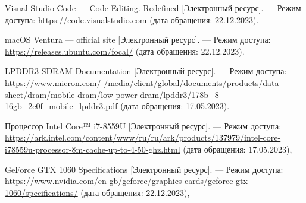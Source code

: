 \begin{thebibliography}{}
	Visual Studio Code --- Code Editing. Redefined [Электронный ресурс]. --- Режим доступа: \url{https://code.visualstudio.com} (дата обращения: 22.12.2023).
	
	macOS Ventura --- official site [Электронный
	ресурс]. --- Режим доступа: \url{https://releases.ubuntu.com/focal/} (дата обращения: 22.12.2023).

	LPDDR3 SDRAM Documentation [Электронный
	ресурс]. --- Режим доступа: \url{https://www.micron.com/-/media/client/global/documents/products/data-sheet/dram/mobile-dram/low-power-dram/lpddr3/178b_8-16gb_2c0f_mobile_lpddr3.pdf} (дата обращения: 17.05.2023).

	Процессор Intel Core™ i7-8559U [Электронный ресурс]. --- Режим доступа: \url{https://ark.intel.com/content/www/ru/ru/ark/products/137979/intel-core-i78559u-processor-8m-cache-up-to-4-50-ghz.html} (дата обращения: 17.05.2023),
	
	GeForce GTX 1060 Specifications [Электронный ресурс]. --- Режим доступа: \url{https://www.nvidia.com/en-gb/geforce/graphics-cards/geforce-gtx-1060/specifications/} (дата обращения: 22.12.2023),

\end{thebibliography}
\endgroup

\pagebreak